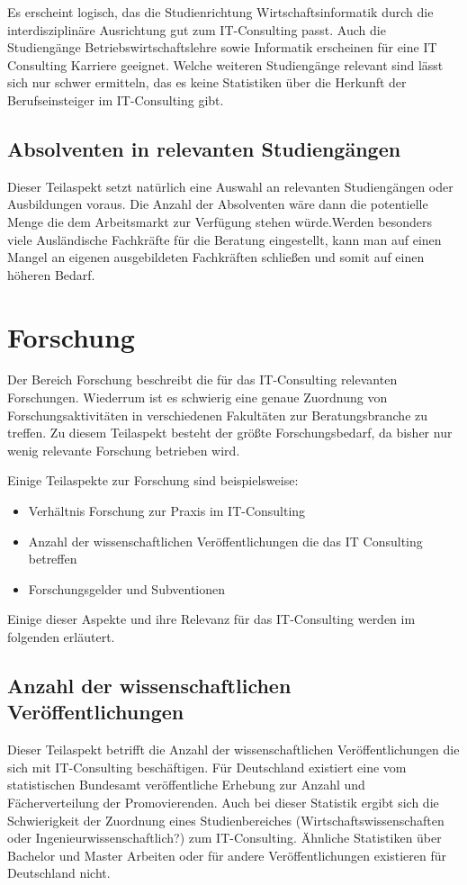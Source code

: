 Es erscheint logisch, das die Studienrichtung Wirtschaftsinformatik durch die interdisziplinäre Ausrichtung gut zum IT-Consulting passt. Auch die Studiengänge Betriebswirtschaftslehre sowie Informatik erscheinen für eine IT Consulting Karriere geeignet. Welche weiteren Studiengänge relevant sind lässt sich nur schwer ermitteln, das es keine Statistiken über die Herkunft der Berufseinsteiger im IT-Consulting gibt.

\subsection{Absolventen in relevanten Studiengängen}
Dieser Teilaspekt setzt natürlich eine Auswahl an relevanten Studiengängen oder Ausbildungen voraus. Die Anzahl der Absolventen wäre dann die potentielle Menge die dem Arbeitsmarkt zur Verfügung stehen würde.Werden besonders viele Ausländische Fachkräfte für die Beratung eingestellt, kann man auf einen Mangel an eigenen ausgebildeten Fachkräften schließen und somit auf einen höheren Bedarf.

\section{Forschung}
Der Bereich Forschung beschreibt die für das IT-Consulting relevanten Forschungen. Wiederrum ist es schwierig eine genaue Zuordnung von Forschungsaktivitäten in verschiedenen Fakultäten zur Beratungsbranche zu treffen. Zu diesem Teilaspekt besteht der größte Forschungsbedarf, da bisher nur wenig relevante Forschung betrieben wird.

Einige Teilaspekte zur Forschung sind beispielsweise:
\begin{itemize}
\item Verhältnis Forschung zur Praxis im IT-Consulting
\item Anzahl der wissenschaftlichen Veröffentlichungen die das IT Consulting betreffen
\item Forschungsgelder und Subventionen
\end{itemize}

Einige dieser Aspekte und ihre Relevanz für das IT-Consulting werden im folgenden erläutert.

\subsection{Anzahl der wissenschaftlichen Veröffentlichungen}
Dieser Teilaspekt betrifft die Anzahl der wissenschaftlichen Veröffentlichungen die sich mit IT-Consulting beschäftigen. 
Für Deutschland existiert eine vom statistischen Bundesamt veröffentliche Erhebung zur Anzahl und Fächerverteilung der Promovierenden.\cite{destatis}
Auch bei dieser Statistik ergibt sich die Schwierigkeit der Zuordnung eines Studienbereiches (Wirtschaftswissenschaften oder Ingenieurwissenschaftlich?) zum IT-Consulting. Ähnliche Statistiken über Bachelor und Master Arbeiten oder für andere Veröffentlichungen existieren für Deutschland nicht. 

